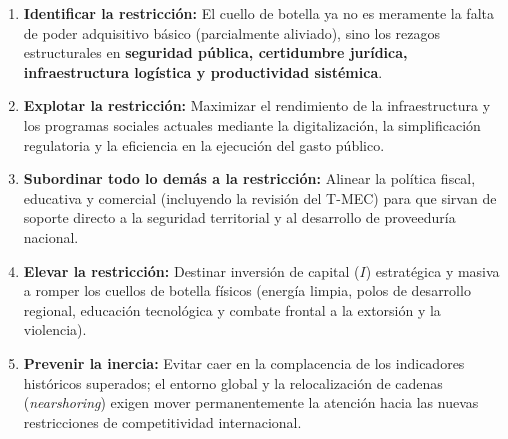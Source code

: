 \documentclass[12pt,letterpaper]{article}
\providecommand{\tightlist}{%
  \setlength{\itemsep}{0pt}\setlength{\parskip}{0pt}}
\begin{document}
\begin{enumerate}
\def\labelenumi{\arabic{enumi}.}
\tightlist
\item
  \textbf{Identificar la restricción:} El cuello de botella ya no es
  meramente la falta de poder adquisitivo básico (parcialmente
  aliviado), sino los rezagos estructurales en \textbf{seguridad
  pública, certidumbre jurídica, infraestructura logística y
  productividad sistémica}.
\item
  \textbf{Explotar la restricción:} Maximizar el rendimiento de la
  infraestructura y los programas sociales actuales mediante la
  digitalización, la simplificación regulatoria y la eficiencia en la
  ejecución del gasto público.
\item
  \textbf{Subordinar todo lo demás a la restricción:} Alinear la
  política fiscal, educativa y comercial (incluyendo la revisión del
  T-MEC) para que sirvan de soporte directo a la seguridad territorial y
  al desarrollo de proveeduría nacional.
\item
  \textbf{Elevar la restricción:} Destinar inversión de capital (\(I\))
  estratégica y masiva a romper los cuellos de botella físicos (energía
  limpia, polos de desarrollo regional, educación tecnológica y combate
  frontal a la extorsión y la violencia).
\item
  \textbf{Prevenir la inercia:} Evitar caer en la complacencia de los
  indicadores históricos superados; el entorno global y la
  relocalización de cadenas (\emph{nearshoring}) exigen mover
  permanentemente la atención hacia las nuevas restricciones de
  competitividad internacional.
\end{enumerate}
\end{document}
